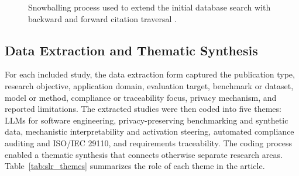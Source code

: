 \documentclass{ieeeaccess}
\begin{document}
\begin{figure}[!t]
\centering
{}
\caption{Snowballing process used to extend the initial database search with backward and forward citation traversal \cite{jalali2012database,wohlin2014snowballing,wohlin2022hybrid}.}
\label{fig:snowballing_process}
\end{figure}

\subsection{Data Extraction and Thematic Synthesis}
\label{subsec:slr_data_extraction}

For each included study, the data extraction form captured the publication type, research objective, application domain, evaluation target, benchmark or dataset, model or method, compliance or traceability focus, privacy mechanism, and reported limitations. The extracted studies were then coded into five themes: LLMs for software engineering, privacy-preserving benchmarking and synthetic data, mechanistic interpretability and activation steering, automated compliance auditing and ISO/IEC 29110, and requirements traceability. The coding process enabled a thematic synthesis that connects otherwise separate research areas. Table~\ref{tab:slr_themes} summarizes the role of each theme in the article.
\end{document}
